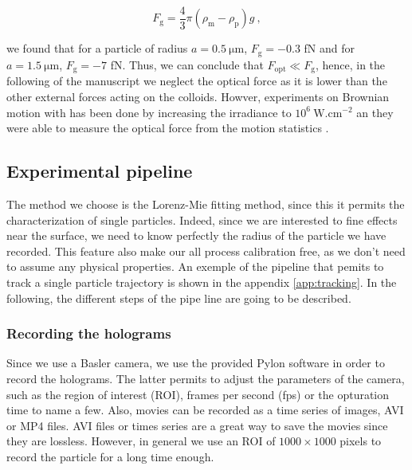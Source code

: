 \begin{equation}
	F_\mathrm{g} =  \frac{4}{3} \pi (\rho_\mathrm{m} - \rho_\mathrm{p}) g ~,
\end{equation}

we found that for a particle of radius $a = 0.5 ~\mathrm{\mu m}$, $F_\mathrm{g} = -0.3 $ fN and for $a = 1.5 ~\mathrm{\mu m}$, $F_\mathrm{g} = -7 $ fN. Thus, we can conclude that $F_\mathrm{opt} \ll F_\mathrm{g}$, hence, in the following of the manuscript we neglect the optical force as it is lower than the other external forces acting on the colloids. Howver, experiments on Brownian motion with has been done by increasing the irradiance to $10^6 ~\mathrm{W.cm^{-2}}$ an they were able to measure the optical force from the motion statistics \cite{prieve_measurement_1999}.




\subsection{Experimental pipeline}
The method we choose is the Lorenz-Mie fitting method, since this it permits the characterization of single particles. Indeed, since we are interested to fine effects near the surface, we need to know perfectly the radius of the particle we have recorded. This feature also make our all process calibration free, as we don't need to assume any physical properties. An exemple of the pipeline that pemits to track a single particle trajectory is shown in the appendix \ref{app:tracking}. In the following, the different steps of the pipe line are going to be described.

\subsubsection{Recording the holograms}
Since we use a Basler camera, we use the provided Pylon software in order to record the holograms. The latter permits to adjust the parameters of the camera, such as the region of interest (\gls{ROI}), frames per second (\gls{fps}) or the opturation time to name a few. Also, movies can be recorded as a time series of images, AVI or MP4 files. AVI files or times series are a great way to save the movies since they are lossless. However, in general we use an \gls{ROI} of $1000 \times 1000$ pixels to record the particle for a long time enough. 


